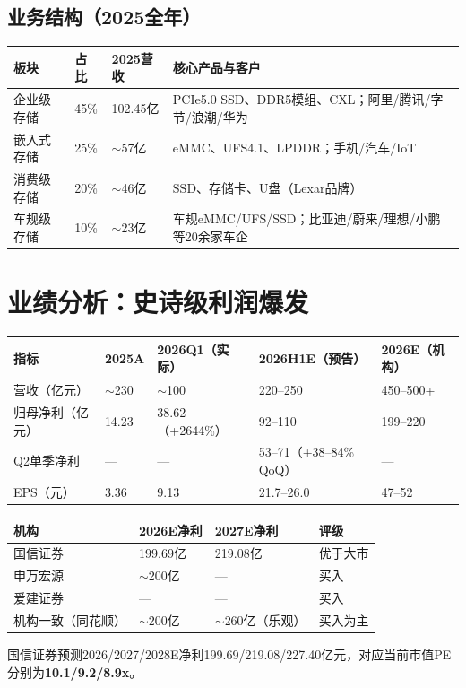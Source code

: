 \documentclass[a4paper,11pt,fontset=none]{ctexart}
\begin{document}
\subsection*{业务结构（2025全年）}

\begin{tabularx}{\textwidth}{L{3cm}L{1.5cm}L{2.5cm}X}
\toprule
\textbf{板块} & \textbf{占比} & \textbf{2025营收} & \textbf{核心产品与客户} \\
\midrule
企业级存储 & 45\% & 102.45亿 & PCIe5.0 SSD、DDR5模组、CXL；阿里/腾讯/字节/浪潮/华为 \\
嵌入式存储 & 25\% & $\sim$57亿 & eMMC、UFS4.1、LPDDR；手机/汽车/IoT \\
消费级存储 & 20\% & $\sim$46亿 & SSD、存储卡、U盘（Lexar品牌） \\
车规级存储 & 10\% & $\sim$23亿 & 车规eMMC/UFS/SSD；比亚迪/蔚来/理想/小鹏等20余家车企 \\
\bottomrule
\end{tabularx}

\section{业绩分析：史诗级利润爆发}

\begin{exhibitbox}
\begin{tabularx}{\textwidth}{L{3.2cm}XXXX}
\toprule
\textbf{指标} & \textbf{2025A} & \textbf{2026Q1（实际）} & \textbf{2026H1E（预告）} & \textbf{2026E（机构）} \\
\midrule
营收（亿元） & $\sim$230 & $\sim$100 & 220--250 & 450--500+ \\
归母净利（亿元） & 14.23 & 38.62（+2644\%） & 92--110 & 199--220 \\
Q2单季净利 & --- & --- & 53--71（+38--84\% QoQ） & --- \\
EPS（元） & 3.36 & 9.13 & 21.7--26.0 & 47--52 \\
\bottomrule
\end{tabularx}
\end{exhibitbox}

\begin{exhibitbox}
\begin{tabularx}{\textwidth}{L{3cm}XXX}
\toprule
\textbf{机构} & \textbf{2026E净利} & \textbf{2027E净利} & \textbf{评级} \\
\midrule
国信证券 & 199.69亿 & 219.08亿 & 优于大市 \\
申万宏源 & $\sim$200亿 & --- & 买入 \\
爱建证券 & --- & --- & 买入 \\
机构一致（同花顺） & $\sim$200亿 & $\sim$260亿（乐观） & 买入为主 \\
\bottomrule
\end{tabularx}

国信证券预测2026/2027/2028E净利199.69/219.08/227.40亿元，对应当前市值PE分别为\textbf{10.1/9.2/8.9x}。
\end{exhibitbox}
\end{document}
